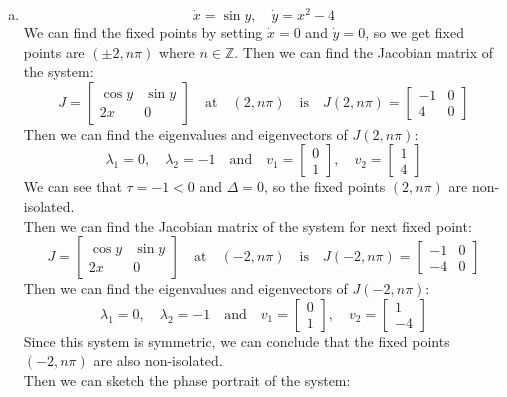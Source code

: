 \documentclass[12pt]{exam}
\begin{document}
\begin{enumerate}[(a)]
	\item \[ \dot{x} = \sin y, \quad \dot{y} = x^2-4 \]
	We can find the fixed points by setting $\dot{x} = 0$ and $\dot{y} = 0$, so we get fixed points are $(\pm 2, n\pi)$ where $n \in \mathbb{Z}$. Then we can find the Jacobian matrix of the system:
	\[ J = \begin{bmatrix}
		\cos y & \sin y \\
		2x & 0
		\end{bmatrix} \quad \text{at} \quad (2,n\pi) \quad \text{is} \quad J(2,n\pi) = \begin{bmatrix}		-1 & 0 \\
		4 & 0
		\end{bmatrix} \]
	Then we can find the eigenvalues and eigenvectors of $J(2,n\pi)$:
	\[ \lambda_1 = 0, \quad \lambda_2 = -1 \quad \text{and} \quad v_1 = \begin{bmatrix}
		0 \\
		1
	\end{bmatrix}, \quad v_2 = \begin{bmatrix}
		1 \\
		4
	\end{bmatrix} \]
	We can see that $\tau = -1<0$ and $\Delta = 0$, so the fixed points $(2,n\pi)$ are non-isolated. \\
	Then we can find the Jacobian matrix of the system for next fixed point:
	\[ J = \begin{bmatrix}
		\cos y & \sin y \\
		2x & 0
		\end{bmatrix} \quad \text{at} \quad (-2,n\pi) \quad \text{is} \quad J(-2,n\pi) = \begin{bmatrix}		-1 & 0 \\
		-4 & 0
		\end{bmatrix} \]
	Then we can find the eigenvalues and eigenvectors of $J(-2,n\pi)$:
	\[ \lambda_1 = 0, \quad \lambda_2 = -1 \quad \text{and} \quad v_1 = \begin{bmatrix}
		0 \\
		1
	\end{bmatrix}, \quad v_2 = \begin{bmatrix}
		1 \\
		-4
	\end{bmatrix} \]
	Since this system is symmetric, we can conclude that the fixed points $(-2,n\pi)$ are also non-isolated. \\
	Then we can sketch the phase portrait of the system:
	\begin{figure}[H]
		\centering

\end{figure}
\end{enumerate}
\end{document}
